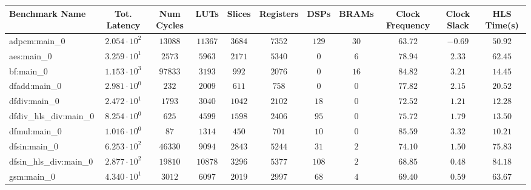 \begin{tabular}{|l|c|c|c|c|c|c|c|c|c|c|}
\hline
Benchmark Name          & Tot. Latency           & Num Cycles & LUTs      & Slices    & Registers & DSPs    & BRAMs   & Clock Frequency & Clock Slack & HLS Time(s) \\
\hline
adpcm:main\_0           & $ 2.054 \cdot 10^{2} $ & $ 13088  $ & $ 11367 $ & $ 3684  $ & $ 7352  $ & $ 129 $ & $ 30  $ & $ 63.72       $ & $ -0.69   $ & $ 50.92   $ \\
aes:main\_0             & $ 3.259 \cdot 10^{1} $ & $ 2573   $ & $ 5963  $ & $ 2171  $ & $ 5340  $ & $ 0   $ & $ 6   $ & $ 78.94       $ & $ 2.33    $ & $ 62.45   $ \\
bf:main\_0              & $ 1.153 \cdot 10^{3} $ & $ 97833  $ & $ 3193  $ & $ 992   $ & $ 2076  $ & $ 0   $ & $ 16  $ & $ 84.82       $ & $ 3.21    $ & $ 14.45   $ \\
dfadd:main\_0           & $ 2.981 \cdot 10^{0} $ & $ 232    $ & $ 2009  $ & $ 611   $ & $ 758   $ & $ 0   $ & $ 0   $ & $ 77.82       $ & $ 2.15    $ & $ 20.52   $ \\
dfdiv:main\_0           & $ 2.472 \cdot 10^{1} $ & $ 1793   $ & $ 3040  $ & $ 1042  $ & $ 2102  $ & $ 18  $ & $ 0   $ & $ 72.52       $ & $ 1.21    $ & $ 12.28   $ \\
dfdiv\_hls\_div:main\_0 & $ 8.254 \cdot 10^{0} $ & $ 625    $ & $ 4599  $ & $ 1598  $ & $ 2406  $ & $ 95  $ & $ 0   $ & $ 75.72       $ & $ 1.79    $ & $ 13.50   $ \\
dfmul:main\_0           & $ 1.016 \cdot 10^{0} $ & $ 87     $ & $ 1314  $ & $ 450   $ & $ 701   $ & $ 10  $ & $ 0   $ & $ 85.59       $ & $ 3.32    $ & $ 10.21   $ \\
dfsin:main\_0           & $ 6.253 \cdot 10^{2} $ & $ 46330  $ & $ 9094  $ & $ 2843  $ & $ 5244  $ & $ 31  $ & $ 2   $ & $ 74.10       $ & $ 1.50    $ & $ 75.83   $ \\
dfsin\_hls\_div:main\_0 & $ 2.877 \cdot 10^{2} $ & $ 19810  $ & $ 10878 $ & $ 3296  $ & $ 5377  $ & $ 108 $ & $ 2   $ & $ 68.85       $ & $ 0.48    $ & $ 84.18   $ \\
gsm:main\_0             & $ 4.340 \cdot 10^{1} $ & $ 3012   $ & $ 6097  $ & $ 2019  $ & $ 2997  $ & $ 68  $ & $ 4   $ & $ 69.40       $ & $ 0.59    $ & $ 63.67   $ \\

\end{tabular}
